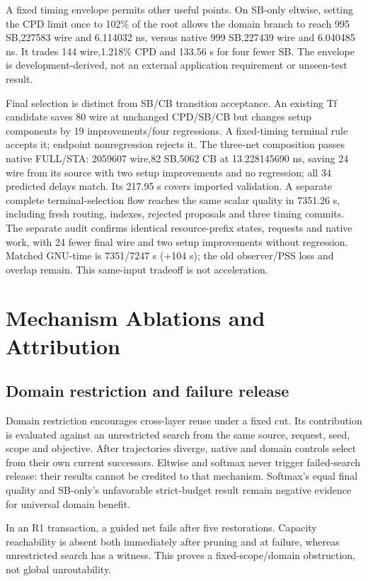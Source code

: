 \documentclass[conference,10pt]{IEEEtran}
\begin{document}
A fixed timing envelope permits other useful points. On SB-only eltwise, setting the CPD limit once to 102\% of the root allows the domain branch to reach 995 SB,227583 wire and 6.114032 ns, versus native 999 SB,227439 wire and 6.040485 ns. It trades 144 wire,1.218\% CPD and 133.56 s for four fewer SB. The envelope is development-derived, not an external application requirement or unseen-test result.

Final selection is distinct from SB/CB transition acceptance. An existing Tf candidate saves 80 wire at unchanged CPD/SB/CB but changes setup components by 19 improvements/four regressions. A fixed-timing terminal rule accepts it; endpoint nonregression rejects it. The three-net composition passes native FULL/STA: 2059607 wire,82 SB,5062 CB at 13.228145690 ns, saving 24 wire from its source with two setup improvements and no regression; all 34 predicted delays match. Its 217.95 s covers imported validation. A separate complete terminal-selection flow reaches the same scalar quality in 7351.26 s, including fresh routing, indexes, rejected proposals and three timing commits. The separate audit confirms identical resource-prefix states, requests and native work, with 24 fewer final wire and two setup improvements without regression. Matched GNU-time is 7351/7247 s (+104 s); the old observer/PSS loss and overlap remain. This same-input tradeoff is not acceleration.
\section{Mechanism Ablations and Attribution}
\subsection{Domain restriction and failure release}
Domain restriction encourages cross-layer reuse under a fixed cut. Its contribution is evaluated against an unrestricted search from the same source, request, seed, scope and objective. After trajectories diverge, native and domain controls select from their own current successors. Eltwise and softmax never trigger failed-search release: their results cannot be credited to that mechanism. Softmax's equal final quality and SB-only's unfavorable strict-budget result remain negative evidence for universal domain benefit.

In an R1 transaction, a guided net fails after five restorations. Capacity reachability is absent both immediately after pruning and at failure, whereas unrestricted search has a witness. This proves a fixed-scope/domain obstruction, not global unroutability.
\end{document}
